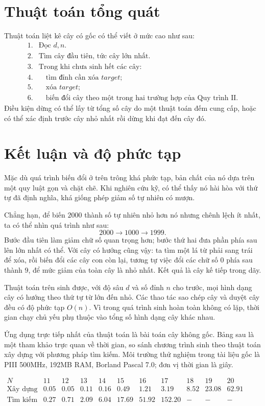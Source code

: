 \documentclass[11pt]{article}
\begin{document}
\section{Thuật toán tổng quát}

Thuật toán liệt kê cây có gốc có thể viết ở mức cao như sau:
\[
\begin{array}{ll}
1. & \text{Đọc } d,n.\\
2. & \text{Tìm cây đầu tiên, tức cây lớn nhất.}\\
3. & \text{Trong khi chưa sinh hết các cây:}\\
4. & \quad \text{tìm đỉnh cần xóa } target;\\
5. & \quad \text{xóa } target;\\
6. & \quad \text{biến đổi cây theo một trong hai trường hợp của Quy trình II.}
\end{array}
\]
Điều kiện dừng có thể lấy từ tổng số cây do một thuật toán đếm cung cấp, hoặc
có thể xác định trước cây nhỏ nhất rồi dừng khi đạt đến cây đó.

\section{Kết luận và độ phức tạp}

Mặc dù quá trình biến đổi ở trên trông khá phức tạp, bản chất của nó dựa trên
một quy luật gọn và chặt chẽ. Khi nghiên cứu kỹ, có thể thấy nó hài hòa với
thứ tự đã định nghĩa, khá giống phép giảm số tự nhiên có mượn.

Chẳng hạn, để biến \(2000\) thành số tự nhiên nhỏ hơn nó nhưng chênh lệch ít
nhất, ta có thể nhìn quá trình như sau:
\[
  2000 \longrightarrow 1000 \longrightarrow 1999.
\]
Bước đầu tiên làm giảm chữ số quan trọng hơn; bước thứ hai đưa phần phía sau
lên lớn nhất có thể. Với cây có hướng cũng vậy: ta tìm một lá từ phải sang
trái để xóa, rồi biến đổi các cây con còn lại, tương tự việc đổi các chữ số
\(0\) phía sau thành \(9\), để mức giảm của toàn cây là nhỏ nhất. Kết quả là
cây kế tiếp trong dãy.

Thuật toán trên sinh được, với độ sâu \(d\) và số đỉnh \(n\) cho trước, mọi
hình dạng cây có hướng theo thứ tự từ lớn đến nhỏ. Các thao tác sao chép cây
và duyệt cây đều có độ phức tạp \(O(n)\). Vì trong quá trình sinh hoàn toàn
không có lặp, thời gian chạy chủ yếu phụ thuộc vào tổng số hình dạng cây khác
nhau.

Ứng dụng trực tiếp nhất của thuật toán là bài toán cây không gốc. Bảng sau là
một tham khảo trực quan về thời gian, so sánh chương trình sinh theo thuật
toán xây dựng với phương pháp tìm kiếm. Môi trường thử nghiệm trong tài liệu
gốc là PIII 500MHz, 192MB RAM, Borland Pascal 7.0; đơn vị thời gian là giây.

\begin{center}
\scriptsize
\(\begin{array}{c|rrrrrrrrrr}
N & 11 & 12 & 13 & 14 & 15 & 16 & 17 & 18 & 19 & 20\\ \hline
\text{Xây dựng} & 0.05 & 0.05 & 0.11 & 0.16 & 0.49 & 1.21 & 3.19 & 8.52 & 23.08 & 62.91\\
\text{Tìm kiếm} & 0.27 & 0.71 & 2.09 & 6.04 & 17.69 & 51.92 & 152.20 & {-} & {-} & {-}
\end{array}\)
\end{center}
\end{document}
